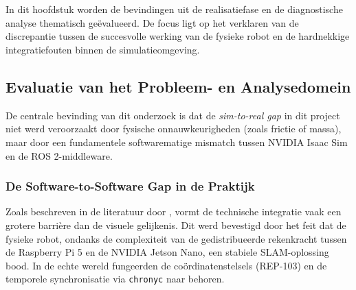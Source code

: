 
\chapter{}
\label{ch:resultaten_discussie}

In dit hoofdstuk worden de bevindingen uit de realisatiefase en de diagnostische analyse thematisch geëvalueerd. De focus ligt op het verklaren van de discrepantie tussen de succesvolle werking van de fysieke robot en de hardnekkige integratiefouten binnen de simulatieomgeving.

\section{Evaluatie van het Probleem- en Analysedomein}
\label{sec:evaluatie_probleem_analyse}

De centrale bevinding van dit onderzoek is dat de \textit{sim-to-real gap} in dit project niet werd veroorzaakt door fysische onnauwkeurigheden (zoals frictie of massa), maar door een fundamentele softwarematige mismatch tussen NVIDIA Isaac Sim en de ROS 2-middleware.

\subsection{De Software-to-Software Gap in de Praktijk}
Zoals beschreven in de literatuur door \textcite{Hoefer2021}, vormt de technische integratie vaak een grotere barrière dan de visuele gelijkenis. Dit werd bevestigd door het feit dat de fysieke robot, ondanks de complexiteit van de gedistribueerde rekenkracht tussen de Raspberry Pi 5 en de NVIDIA Jetson Nano, een stabiele SLAM-oplossing bood. In de echte wereld fungeerden de coördinatenstelsels (REP-103) en de temporele synchronisatie via \texttt{chronyc} naar behoren.

